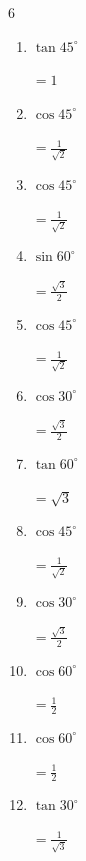 \begin{multicols}{6}
\begin{enumerate}
        $\displaystyle =\frac{1}{2}$

  \item $\displaystyle \tan{45^\circ}$

        $\displaystyle =1$

  \item $\displaystyle \cos{45^\circ}$

        $\displaystyle =\frac{1}{\sqrt{2}}$

  \item $\displaystyle \cos{45^\circ}$

        $\displaystyle =\frac{1}{\sqrt{2}}$

  \item $\displaystyle \sin{60^\circ}$

        $\displaystyle =\frac{\sqrt{3}}{2}$

  \item $\displaystyle \cos{45^\circ}$

        $\displaystyle =\frac{1}{\sqrt{2}}$

  \item $\displaystyle \cos{30^\circ}$

        $\displaystyle =\frac{\sqrt{3}}{2}$

\columnbreak %

\resetques

  \item $\displaystyle \tan{60^\circ}$

        $\displaystyle =\sqrt{3}$

  \item $\displaystyle \cos{45^\circ}$

        $\displaystyle =\frac{1}{\sqrt{2}}$

  \item $\displaystyle \cos{30^\circ}$

        $\displaystyle =\frac{\sqrt{3}}{2}$

  \item $\displaystyle \cos{60^\circ}$

        $\displaystyle =\frac{1}{2}$

  \item $\displaystyle \cos{60^\circ}$

        $\displaystyle =\frac{1}{2}$

  \item $\displaystyle \tan{30^\circ}$

        $\displaystyle =\frac{1}{\sqrt{3}}$


\end{enumerate}
\end{multicols}
